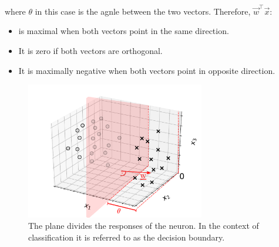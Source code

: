 \begin{frame}
{    where $\theta$ in this case is the agnle between the two vectors. Therefore, $\vec w^\top \vec x$:
    
    \begin{itemize}
    \item is maximal when both vectors point in the same direction.
    \item It is zero if both vectors are orthogonal.
    \item It is maximally negative when both vectors point in opposite direction.
    \end{itemize}
    }
   
\end{frame}
\begin{frame}
    
    \begin{figure}[h]
        \centering
        \includegraphics[height=6cm]{img/neuron_3d_grid_hyperplane.pdf}
        \caption{The plane divides the responses of the neuron. In the context of classification it is referred to as the decision boundary.}
        \label{fig:neuron_3d_grid_hyperplane}
    \end{figure}
    
\end{frame}
